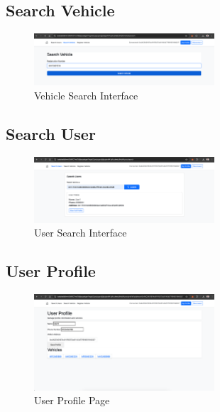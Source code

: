 \documentclass[12pt,a4paper]{article}
\begin{document}
    \subsection{Search Vehicle}
    \begin{figure}[H]
        \centering
        \includegraphics[width=0.6\textwidth]{screenshots/vehicle search.png}
        \caption{Vehicle Search Interface}
        \label{fig:search-vehicle}
    \end{figure}

    \subsection{Search User}
    \begin{figure}[H]
        \centering
        \includegraphics[width=0.6\textwidth]{screenshots/user search.png}
        \caption{User Search Interface}
        \label{fig:search-user}
    \end{figure}

    \subsection{User Profile}
    \begin{figure}[H]
        \centering
        \includegraphics[width=0.6\textwidth]{screenshots/user profile with list of vehicle.png}
        \caption{User Profile Page}
        \label{fig:user-profile}
    \end{figure}
\end{document}
